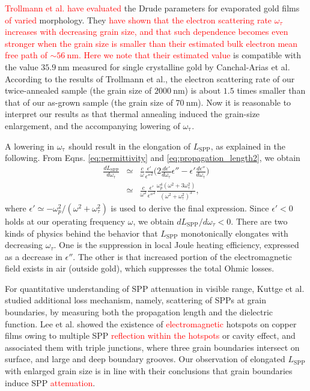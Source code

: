 \documentclass[aip,apl,reprint]{revtex4-1}
\begin{document}
\color{black}
\textcolor{red}{Trollmann et al.\cite{Trollmann} have evaluated} the Drude parameters for evaporated gold films \textcolor{red}{of varied} morphology. They \textcolor{red}{have shown that the electron scattering rate $\omega_{\tau}$ increases with decreasing grain size, and that such dependence becomes even stronger when the grain size is smaller than their estimated bulk electron mean free path of $\sim 56\:\mathrm{nm}$.} \textcolor{red}{Here we note that their estimated value} is compatible with the value $35.9 \:\mathrm{nm}$ measured for single crystalline gold by Canchal-Arias et al.\cite{Canchal-Arias} 
\color{red}According to the results of Trollmann et al.,\cite{Trollmann} the electron scattering rate  of our twice-annealed sample (the grain size of $2000\:\mathrm{nm}$) is about $1.5$ times smaller than that of our as-grown sample (the grain size of $70\:\mathrm{nm}$). Now it is reasonable to interpret our results as that thermal annealing induced the grain-size enlargement, and the accompanying lowering of $\omega_{\mathrm{\tau}}$.

\color{red}
A lowering in $\omega_{\mathrm{\tau}}$ should result in the elongation of $L_{\mathrm{SPP}}$, as explained in the following. From Eqns. \ref{eq:permittivity} and \ref{eq:propagation_length2}, we obtain
\begin{eqnarray}
\frac{dL_{\mathrm{SPP}}}{d\omega_{\mathrm{\tau}}} &\simeq& \frac{c}{\omega} \frac{\epsilon'}{\epsilon''^2} \biggl( 2\frac{d\epsilon'}{d\omega_{\mathrm{\tau}}}\epsilon'' - \epsilon' \frac{d\epsilon''}{d\omega_{\mathrm{\tau}}} \biggr) \nonumber \\
&\simeq& \frac{c}{\omega^2} \frac{\epsilon'}{\epsilon''^2} \frac{\omega_p^4 (\omega^2+3\omega_{\mathrm{\tau}}^2)}{ (\omega^2+\omega_{\mathrm{\tau}}^2)^3},
\end{eqnarray}
where $\epsilon' \simeq -\omega_p^2/(\omega^2+\omega_{\tau}^2)$ is used to derive the final expression. Since $\epsilon'<0$ holds at our operating frequency $\omega$, we obtain $dL_{\mathrm{SPP}}/d\omega_{\tau} < 0$. 
There are two kinds of physics behind the behavior that $L_{\mathrm{SPP}}$ monotonically elongates with decreasing $\omega_{\tau}$. One is the suppression in local Joule heating efficiency, expressed as a decrease in $\epsilon''$. The other is that increased portion of the electromagnetic field exists in air (outside gold), which suppresses the total Ohmic losses.

\color{black}
For quantitative understanding of SPP attenuation in visible range, Kuttge et al.\cite{Kuttge} studied additional loss mechanism, namely, scattering of SPPs at grain boundaries, by measuring both the propagation length and the dielectric function. 
Lee et al.\cite{Lee} showed the existence of \textcolor{red}{electromagnetic} hotspots on copper films owing to multiple SPP \textcolor{red}{reflection within the hotspots} or cavity effect, and associated them with triple junctions, where three grain boundaries intersect on surface, and large and deep boundary grooves. Our observation of elongated $L_{\mathrm{SPP}}$ with enlarged grain size is in line with their conclusions that grain boundaries induce SPP \textcolor{red}{attenuation}.
 
\end{document}
